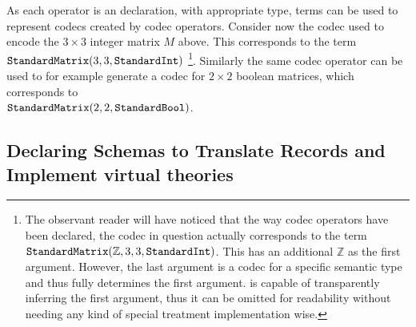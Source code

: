 As each operator is an \mmt declaration, with appropriate type, \mmt terms can be used to represent codecs created by codec operators. 
Consider now the codec used to encode the $3 \times 3$ integer matrix $M$ above. 
This corresponds to the \mmt term \\$\plaintt{StandardMatrix}(3, 3, \plaintt{StandardInt})$ \footnote{
  The observant reader will have noticed that the way codec operators have been declared, the codec in question actually corresponds to the term $\plaintt{StandardMatrix}(\mathbb{Z}, 3, 3, \plaintt{StandardInt})$. 
  This has an additional $\mathbb{Z}$ as the first argument. 
  However, the last argument is a codec for a specific semantic type and thus fully determines the first argument. 
  \mmt is capable of transparently inferring the first argument, thus it can be omitted for readability without needing any kind of special treatment implementation wise.  
}. 
Similarly the same codec operator can be used to for example generate a codec for $2 \times 2$ boolean matrices, which corresponds to 
\\$\plaintt{StandardMatrix}(2, 2, \plaintt{StandardBool})$. 

\subsection{Declaring Schemas to Translate Records and Implement virtual theories}\label{sec:vt:schemas}

